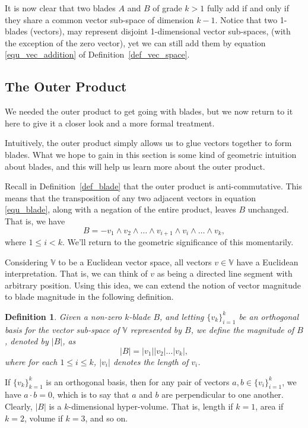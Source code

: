 \documentclass[12pt]{article}
\newcommand{\V}{\mathbb{V}}
\newtheorem{definition}{Definition}[section]
\begin{document}
It is now clear that two blades $A$ and $B$ of grade $k>1$ fully add if and only if they
share a common vector sub-space of dimension $k-1$.  Notice that
two 1-blades (vectors), may represent disjoint 1-dimensional vector sub-spaces,
(with the exception of the zero vector), yet we can still add them by
equation \eqref{equ_vec_addition} of Definition~\ref{def_vec_space}.

\subsection{The Outer Product}

We needed the outer product to get going with blades, but we now
return to it here to give it a closer look and a more formal treatment.

Intuitively, the outer product simply allows us to glue vectors
together to form blades.  What we hope to gain in this section
is some kind of geometric intuition about blades, and this will
help us learn more about the outer product.

Recall in Definition~\ref{def_blade} that the outer product is anti-commutative.
This means that the transposition of any two adjacent vectors in
equation \eqref{equ_blade}, along with a negation of the
entire product, leaves $B$ unchanged.  That is, we have
\begin{equation}\label{equ_adj_trans}
B = -v_1\wedge v_2\wedge\dots\wedge v_{i+1}\wedge v_i\wedge\dots\wedge v_k,
\end{equation}
where $1\leq i<k$.  We'll return to the geometric significance of this momentarily.

Considering $\V$ to be a Euclidean vector space, all vectors $v\in\V$ have
a Euclidean interpretation.  That is, we can think of $v$ as being a directed
line segment with arbitrary position.  Using this idea, we can extend the notion
of vector magnitude to blade magnitude in the following definition.
\begin{definition}\label{def_blade_mag}
Given a non-zero $k$-blade $B$, and letting $\{v_k\}_{i=1}^k$ be
an orthogonal basis for the vector sub-space of $\V$ represented
by $B$, we define the magnitude of $B$, denoted by $|B|$, as
\begin{equation}
|B| = |v_1||v_2|\dots |v_k|,
\end{equation}
where for each $1\leq i\leq k$, $|v_i|$ denotes the length of $v_i$.
\end{definition}
If $\{v_k\}_{k=1}^k$ is an orthogonal basis, then for any pair of vectors $a,b\in\{v_i\}_{i=1}^k$,
we have $a\cdot b=0$, which is to say that $a$ and $b$ are perpendicular to one another.
Clearly, $|B|$ is a $k$-dimensional hyper-volume.  That is, length if $k=1$, area if $k=2$, volume
if $k=3$, and so on.
\end{document}
